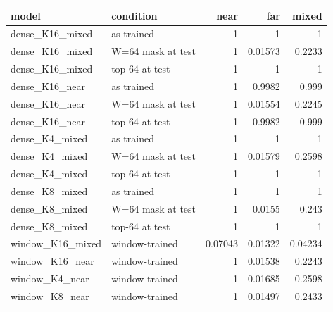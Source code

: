 \begin{table}
\label{tab:task2b_mask_controls}
\begin{tabular}{llrrr}
\toprule
model & condition & near & far & mixed \\
\midrule
dense\_K16\_mixed & as trained & 1 & 1 & 1 \\
dense\_K16\_mixed & W=64 mask at test & 1 & 0.01573 & 0.2233 \\
dense\_K16\_mixed & top-64 at test & 1 & 1 & 1 \\
dense\_K16\_near & as trained & 1 & 0.9982 & 0.999 \\
dense\_K16\_near & W=64 mask at test & 1 & 0.01554 & 0.2245 \\
dense\_K16\_near & top-64 at test & 1 & 0.9982 & 0.999 \\
dense\_K4\_mixed & as trained & 1 & 1 & 1 \\
dense\_K4\_mixed & W=64 mask at test & 1 & 0.01579 & 0.2598 \\
dense\_K4\_mixed & top-64 at test & 1 & 1 & 1 \\
dense\_K8\_mixed & as trained & 1 & 1 & 1 \\
dense\_K8\_mixed & W=64 mask at test & 1 & 0.0155 & 0.243 \\
dense\_K8\_mixed & top-64 at test & 1 & 1 & 1 \\
window\_K16\_mixed & window-trained & 0.07043 & 0.01322 & 0.04234 \\
window\_K16\_near & window-trained & 1 & 0.01538 & 0.2243 \\
window\_K4\_near & window-trained & 1 & 0.01685 & 0.2598 \\
window\_K8\_near & window-trained & 1 & 0.01497 & 0.2433 \\
\bottomrule
\end{tabular}
\end{table}
